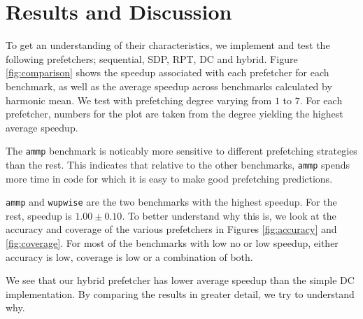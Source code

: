 \section{Results and Discussion}
\label{sec:results-and-discussion}

To get an understanding of their characteristics, we implement and
test the following prefetchers; sequential, SDP, RPT, DC and hybrid.
Figure \ref{fig:comparison} shows the speedup associated with each
prefetcher for each benchmark, as well as the average speedup across
benchmarks calculated by harmonic mean. We test with prefetching
degree varying from $1$ to $7$. For each prefetcher, numbers for the
plot are taken from the degree yielding the highest average speedup.

The \texttt{ammp} benchmark is noticably more sensitive to different
prefetching strategies than the rest. This indicates that relative to
the other benchmarks, \texttt{ammp} spends more time in code for which
it is easy to make good prefetching predictions.

\texttt{ammp} and \texttt{wupwise} are the two benchmarks with the
highest speedup.  For the rest, speedup is $1.00\pm0.10$. To better
understand why this is, we look at the accuracy and coverage of the
various prefetchers in Figures \ref{fig:accuracy} and
\ref{fig:coverage}. For most of the benchmarks with low no or low
speedup, either accuracy is low, coverage is low or a combination of
both.

We see that our hybrid prefetcher has lower average speedup than the
simple DC implementation.  By comparing the results in greater detail,
we try to understand why.

